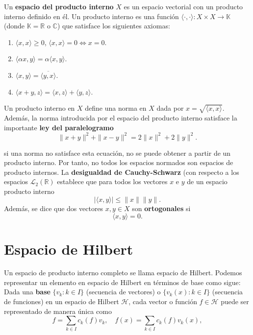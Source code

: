 \begin{multicols}{2}
Un \textbf{espacio del producto interno} $X$ es un espacio vectorial con un producto interno definido en él. Un producto interno es una función $\langle \cdot , \cdot \rangle : X \times X \to \mathbb{K}$ (donde $\mathbb{K} = \mathbb{R}$ o $\mathbb{C}$) que satisface los siguientes axiomas:
\begin{enumerate}[\bfseries (i)]
	\item $\langle x, x \rangle \geq 0$, $\langle x, x \rangle = 0 \Leftrightarrow x = 0$.
	\item $\langle  \alpha x, y \rangle = \alpha\langle x,y\rangle$.
	\item $\langle x,y \rangle = \overline{\langle y,x \rangle}$.
	\item $\langle x+y, z\rangle = \langle x,z \rangle + \langle y,z \rangle$.
\end{enumerate}

Un producto interno en $X$ define una norma en $X$ dada por $x = \sqrt{\langle x,x\rangle}$. Además, la norma introducida por el espacio del producto interno satisface la importante \textbf{ley del paralelogramo}
\begin{equation}
	\|x+y\|^2 + \|x-y\|^2 = 2\|x\|^2 + 2\|y\|^2.
\label{eq:paralelogramo}
\end{equation}

si una norma no satisface esta ecuación, no se puede obtener a partir de un producto interno. Por tanto, no todos los espacios normados son espacios de producto internos. La \textbf{desigualdad de Cauchy-Schwarz} (con respecto a los espacios $\mathcal{L}_2(\mathbb{R})$ establece que para todos los vectores $x$ e $y$ de un espacio producto interno
\begin{equation}
    |\langle x,y \rangle| \leq \|x\|\|y\|.
\label{eq:Cauchy-Schwarz}
\end{equation}
Además, se dice que dos vectores $x, y \in X$ son \textbf{ortogonales} si 
\begin{equation}
	\langle x, y\rangle = 0.
\label{eq:ortogonal}
\end{equation}


\section{Espacio de Hilbert}
Un espacio de producto interno completo se llama espacio de Hilbert. Podemos representar un elemento en espacio de Hilbert en términos de base como sigue: Dada una \textbf{base} $\{v_k : k \in I\}$ (secuencia de vectores) o $\{v_k (x) : k \in I\}$ (secuencia de funciones) en un espacio de Hilbert $\mathcal{H}$, cada vector o función $f \in \mathcal{H}$ puede ser representado de manera única como
\begin{equation}
    f = \sum_{k \in I} c_k (f) v_k, \quad f(x) = \sum_{k \in I} c_k (f) v_k (x),
\label{eq:baseHilbert}
\end{equation}


\end{multicols}

